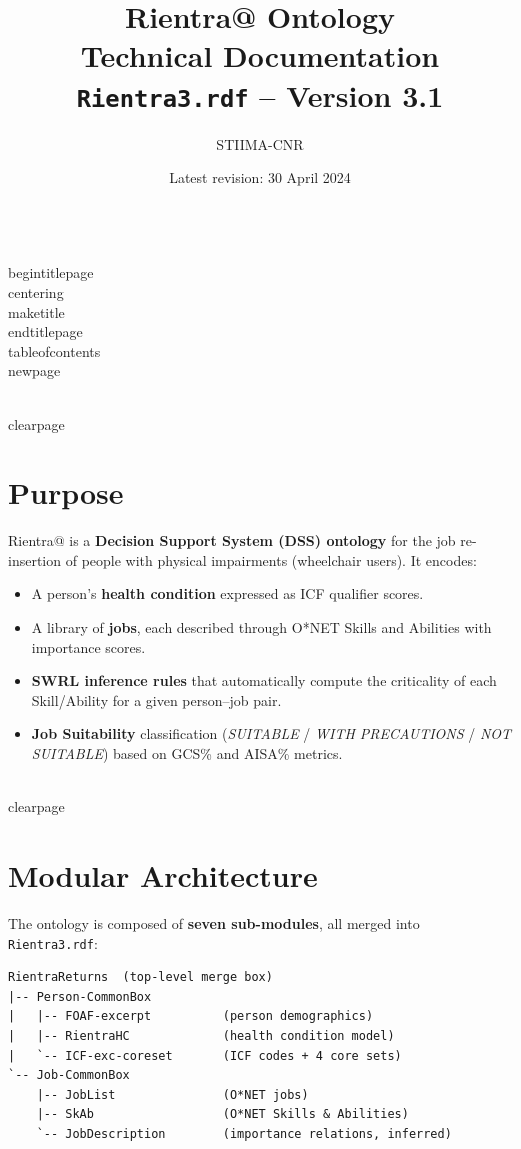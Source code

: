 ﻿\documentclass[12pt,a4paper]{article}
\title{\textbf{Rientra@ Ontology}\\[0.5em]\large Technical Documentation\\[0.3em]
  \normalsize \texttt{Rientra3.rdf} -- Version 3.1}
\author{STIIMA-CNR}
\date{Latest revision: 30 April 2024}
\begin{document}
\\begin{titlepage}
\\centering
\\maketitle
\\end{titlepage}
\\tableofcontents
\\newpage

\\clearpage
\section{Purpose}

Rientra@ is a \textbf{Decision Support System (DSS) ontology} for the job re-insertion of people with physical impairments (wheelchair users). It encodes:

\begin{itemize}
  \item A person's \textbf{health condition} expressed as ICF qualifier scores.
  \item A library of \textbf{jobs}, each described through O*NET Skills and Abilities with importance scores.
  \item \textbf{SWRL inference rules} that automatically compute the criticality of each Skill/Ability for a given person--job pair.
  \item \textbf{Job Suitability} classification (\textit{SUITABLE} / \textit{WITH PRECAUTIONS} / \textit{NOT SUITABLE}) based on GCS\% and AISA\% metrics.
\end{itemize}

\\clearpage
\section{Modular Architecture}

The ontology is composed of \textbf{seven sub-modules}, all merged into \texttt{Rientra3.rdf}:

\begin{lstlisting}
RientraReturns  (top-level merge box)
|-- Person-CommonBox
|   |-- FOAF-excerpt          (person demographics)
|   |-- RientraHC             (health condition model)
|   `-- ICF-exc-coreset       (ICF codes + 4 core sets)
`-- Job-CommonBox
    |-- JobList               (O*NET jobs)
    |-- SkAb                  (O*NET Skills & Abilities)
    `-- JobDescription        (importance relations, inferred)
\end{lstlisting}
\end{document}
